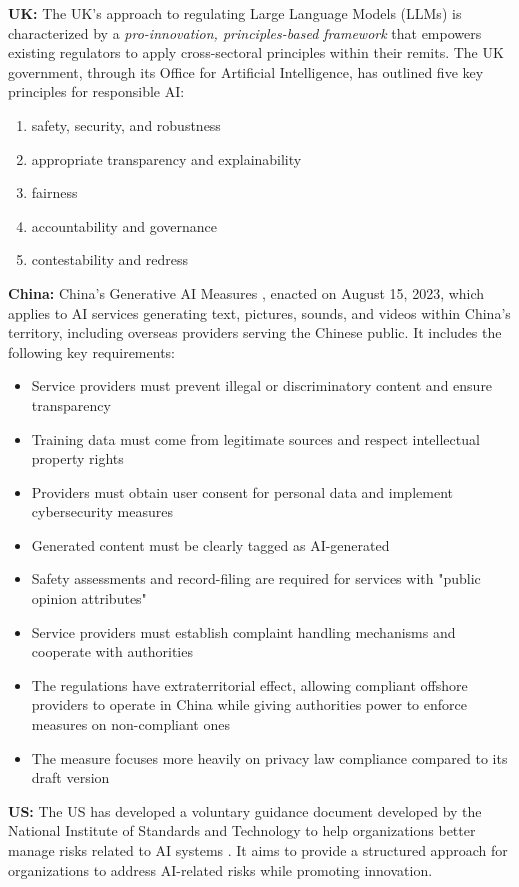 \textbf{UK:} The UK's approach to regulating Large Language Models (LLMs)  is characterized by a \textit{pro-innovation, principles-based framework} that empowers existing regulators to apply cross-sectoral principles within their remits. The UK government, through its Office for Artificial Intelligence, has outlined five key principles for responsible AI:
\begin{enumerate}
    \item safety, security, and robustness
    \item appropriate transparency and explainability
    \item fairness
    \item accountability and governance
    \item contestability and redress
\end{enumerate}

\textbf{China:} China's Generative AI Measures , enacted on August 15, 2023, which applies to AI services generating text, pictures, sounds, and videos within China's territory, including overseas providers serving the Chinese public. It includes the following key requirements:
\begin{itemize}
    \item Service providers must prevent illegal or discriminatory content and ensure transparency
    \item Training data must come from legitimate sources and respect intellectual property rights
    \item Providers must obtain user consent for personal data and implement cybersecurity measures
    \item Generated content must be clearly tagged as AI-generated
    \item Safety assessments and record-filing are required for services with "public opinion attributes"
    \item Service providers must establish complaint handling mechanisms and cooperate with authorities
    \item The regulations have extraterritorial effect, allowing compliant offshore providers to operate in China while giving authorities power to enforce measures on non-compliant ones
    \item The measure focuses more heavily on privacy law compliance compared to its draft version
\end{itemize}

\textbf{US:} The US has developed a voluntary guidance document developed by the National Institute of Standards and Technology to help organizations better manage risks related to AI systems . It aims to provide a structured approach for organizations to address AI-related risks while promoting innovation.

